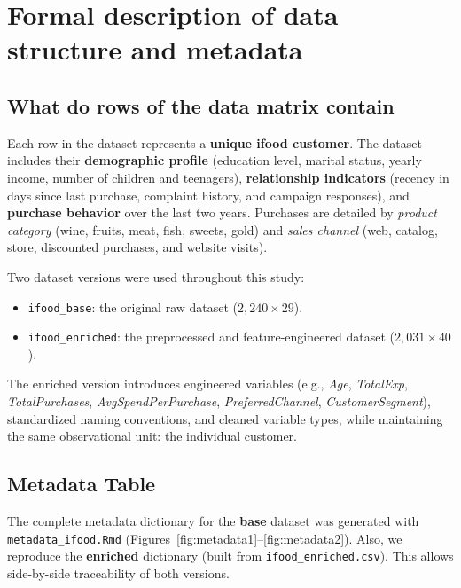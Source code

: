 \newpage
\section{Formal description of data structure and metadata}
\label{sec:metadata}

\subsection{What do rows of the data matrix contain}

Each row in the dataset represents a \textbf{unique ifood customer}. The dataset includes
their \textbf{demographic profile} (education level, marital status, yearly income,
number of children and teenagers), \textbf{relationship indicators} (recency in days
since last purchase, complaint history, and campaign responses), and \textbf{purchase
behavior} over the last two years. Purchases are detailed by \textit{product category}
(wine, fruits, meat, fish, sweets, gold) and \textit{sales channel} (web, catalog,
store, discounted purchases, and website visits).

Two dataset versions were used throughout this study:
\begin{itemize}
    \item \texttt{ifood\_base}: the original raw dataset (\(2{,}240 \times 29\)).
    \item \texttt{ifood\_enriched}: the preprocessed and feature-engineered dataset (\(2{,}031 \times 40\)).
\end{itemize}

The enriched version introduces engineered variables (e.g., \textit{Age}, \textit{TotalExp},
\textit{TotalPurchases}, \textit{AvgSpendPerPurchase}, \textit{PreferredChannel},
\textit{CustomerSegment}), standardized naming conventions, and cleaned variable
types, while maintaining the same observational unit: the individual customer.

\vspace{0.5em}

\subsection{Metadata Table}

The complete metadata dictionary for the \textbf{base} dataset was generated with \texttt{metadata\_ifood.Rmd} (Figures~\ref{fig:metadata1}–\ref{fig:metadata2}). 
Also, we reproduce the \textbf{enriched} dictionary (built from \texttt{ifood\_enriched.csv}). This allows side-by-side traceability of both versions.

